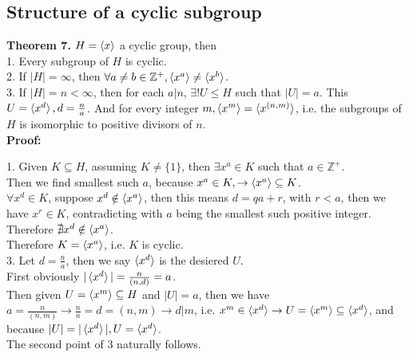 \documentclass{article}
\begin{document}
\subsection{Structure of a cyclic subgroup}
\textbf{Theorem 7.} $H = \braket{x}$ a cyclic group, then\\
1. Every subgroup of $H$ is cyclic.\\
2. If $|H| = \infty$, then $\forall a \neq b \in \mathbb{Z}^+, \braket{x^a} \neq \braket{x^b}$.\\
3. If $|H| = n < \infty$, then for each $a | n$, $\exists ! U \leq H$ such that $|U| = a$. This $U = \braket{x^d}, d = \frac{n}{a}$. And for every integer $m, \braket{x^m} = \braket{x^{(n,m)}}$, i.e. the subgroups of $H$ is isomorphic to positive divisors of $n$.\\
\textbf{Proof:}
\begin{addmargin}[1em]{0em}
1. Given $K \subseteq H$, assuming $K \neq \{1\}$, then $\exists x^a \in K$ such that $a \in \mathbb{Z}^+$.\\
Then we find smallest such $a$, because $x^a \in K, \rightarrow \braket{x^a} \subseteq K$.\\
$\forall x^d \in K$, suppose $x^d \notin \braket{x^a}$, then this means $d = qa+r$, with $r < a$, then we have $x^r \in K$, contradicting with $a$ being the smallest such positive integer. Therefore $\nexists x^d \notin \braket{x^a}$.\\
Therefore $K = \braket{x^a}$, i.e. $K$ is cyclic.\\
3. Let $d = \frac{n}{a}$, then we say $\braket{x^d}$ is the desiered $U$.\\
First obviously $|\braket{x^d}| = \frac{n}{(n, d)} = a$.\\
Then given $U = \braket{x^m} \subseteq H$ and $|U| = a$, then we have $a = \frac{n}{(n, m)} \rightarrow \frac{n}{a} = d = (n, m) \rightarrow d | m$, i.e. $x^m \in \braket{x^d} \rightarrow U = \braket{x^m} \subseteq \braket{x^d}$, and because $|U| = |\braket{x^d}|, U = \braket{x^d}$.\\
The second point of 3 naturally follows.
\end{addmargin}
\end{document}
